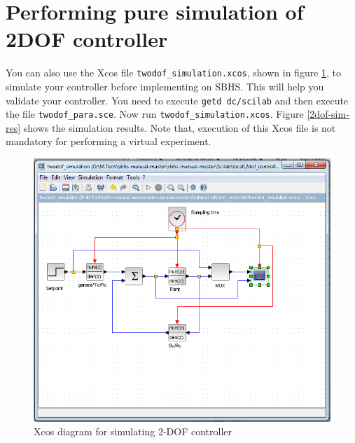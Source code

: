 \section{Performing pure simulation of 2DOF controller}
You can also use the Xcos file {\tt twodof\_simulation.xcos}, shown in figure \ref{2dof-sim-xcos}, to simulate your controller before implementing on SBHS. This will help you validate your controller. You need to execute {\tt getd dc/scilab} and then execute the file {\tt twodof\_para.sce}. Now run {\tt twodof\_simulation.xcos}. Figure \ref{2dof-sim-res} shows the simulation results. Note that, execution of this Xcos file is not mandatory for performing a virtual experiment.


\begin{figure}
\centering
\includegraphics[width=0.8\linewidth]{2-DOF_manual/2dof-sim-xcos}
\caption{Xcos diagram for simulating 2-DOF controller}
\label{2dof-sim-xcos}
\end{figure}

